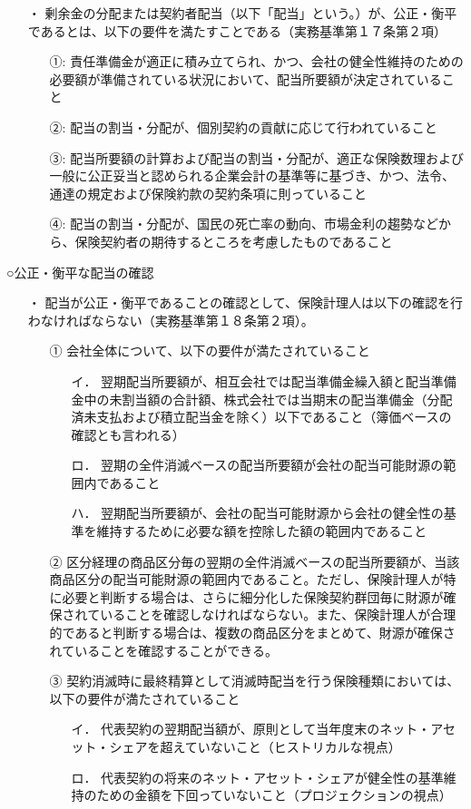 \documentclass[report,gutter=10mm,fore-edge=10mm,uplatex,dvipdfmx]{jlreq}
\begin{document}
\begin{itemize}
\item[・] 剰余金の分配または契約者配当（以下「配当」という。）が、公正・衡平であるとは、以下の要件を満たすことである（実務基準第１７条第２項）
\begin{itemize}
\item[①: ] 責任準備金が適正に積み立てられ、かつ、会社の健全性維持のための必要額が準備されている状況において、配当所要額が決定されていること
\item[②: ] 配当の割当・分配が、個別契約の貢献に応じて行われていること
\item[③: ] 配当所要額の計算および配当の割当・分配が、適正な保険数理および一般に公正妥当と認められる企業会計の基準等に基づき、かつ、法令、通達の規定および保険約款の契約条項に則っていること
\item[④: ] 配当の割当・分配が、国民の死亡率の動向、市場金利の趨勢などから、保険契約者の期待するところを考慮したものであること
\end{itemize}
\end{itemize}

○公正・衡平な配当の確認
\begin{itemize}
\item[・]配当が公正・衡平であることの確認として、保険計理人は以下の確認を行わなければならない（実務基準第１８条第２項）。
\begin{itemize}
\item[①]会社全体について、以下の要件が満たされていること
\begin{itemize}
\item[イ． ] 翌期配当所要額が、相互会社では配当準備金繰入額と配当準備金中の未割当額の合計額、株式会社では当期末の配当準備金（分配済未支払および積立配当金を除く）以下であること（簿価ベースの確認とも言われる）
\item[ロ． ] 翌期の全件消滅ベースの配当所要額が会社の配当可能財源の範囲内であること
\item[ハ． ] 翌期配当所要額が、会社の配当可能財源から会社の健全性の基準を維持するために必要な額を控除した額の範囲内であること
\end{itemize}
\item[②] 区分経理の商品区分毎の翌期の全件消滅ベースの配当所要額が、当該商品区分の配当可能財源の範囲内であること。ただし、保険計理人が特に必要と判断する場合は、さらに細分化した保険契約群団毎に財源が確保されていることを確認しなければならない。また、保険計理人が合理的であると判断する場合は、複数の商品区分をまとめて、財源が確保されていることを確認することができる。
\item[③] 契約消滅時に最終精算として消滅時配当を行う保険種類においては、以下の要件が満たされていること
\begin{itemize}
\item[イ．] 代表契約の翌期配当額が、原則として当年度末のネット・アセット・シェアを超えていないこと（ヒストリカルな視点）
\item[ロ．] 代表契約の将来のネット・アセット・シェアが健全性の基準維持のための金額を下回っていないこと（プロジェクションの視点）
\end{itemize}
\end{itemize}
\end{itemize}
\end{document}
